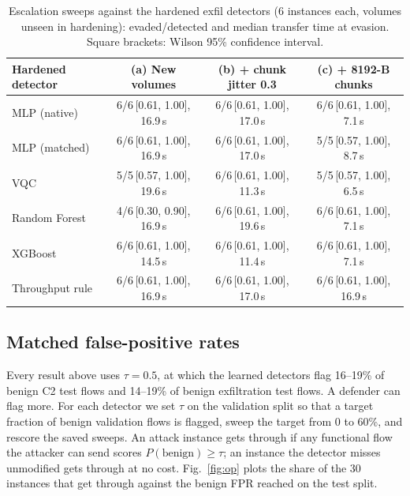 \documentclass[preprint,12pt]{elsarticle}
\begin{document}
\begin{table}[htbp]
\centering
\caption{Escalation sweeps against the hardened exfil detectors (6 instances each, volumes unseen in
hardening): evaded/detected and median transfer time at evasion. Square brackets: Wilson 95\% confidence interval.}
\label{tab:exfil-escalation}
\setlength{\tabcolsep}{3pt}\footnotesize
\begin{tabular}{lccc}
\toprule
Hardened detector & (a) New volumes & (b) + chunk jitter 0.3 & (c) + 8192-B chunks \\
\midrule
MLP (native)    & 6/6\,{\scriptsize[0.61, 1.00]}, 16.9\,s & 6/6\,{\scriptsize[0.61, 1.00]}, 17.0\,s & 6/6\,{\scriptsize[0.61, 1.00]}, 7.1\,s \\
MLP (matched)   & 6/6\,{\scriptsize[0.61, 1.00]}, 16.9\,s & 6/6\,{\scriptsize[0.61, 1.00]}, 17.0\,s & 5/5\,{\scriptsize[0.57, 1.00]}, 8.7\,s \\
VQC             & 5/5\,{\scriptsize[0.57, 1.00]}, 19.6\,s & 6/6\,{\scriptsize[0.61, 1.00]}, 11.3\,s & 5/5\,{\scriptsize[0.57, 1.00]}, 6.5\,s \\
Random Forest   & 4/6\,{\scriptsize[0.30, 0.90]}, 16.9\,s & 6/6\,{\scriptsize[0.61, 1.00]}, 19.6\,s & 6/6\,{\scriptsize[0.61, 1.00]}, 7.1\,s \\
XGBoost         & 6/6\,{\scriptsize[0.61, 1.00]}, 14.5\,s & 6/6\,{\scriptsize[0.61, 1.00]}, 11.4\,s & 6/6\,{\scriptsize[0.61, 1.00]}, 7.1\,s \\
Throughput rule & 6/6\,{\scriptsize[0.61, 1.00]}, 16.9\,s & 6/6\,{\scriptsize[0.61, 1.00]}, 17.0\,s & 6/6\,{\scriptsize[0.61, 1.00]}, 16.9\,s \\
\bottomrule
\end{tabular}
\end{table}

\subsection{Matched false-positive rates}
\label{sec:op}
Every result above uses $\tau=0.5$, at which the learned detectors flag 16--19\% of benign C2 test flows
and 14--19\% of benign exfiltration test flows. A defender can flag more. For each detector we set
$\tau$ on the validation split so that a target fraction of benign validation flows is flagged, sweep the
target from 0 to 60\%, and rescore the saved sweeps. An attack instance gets through if any functional
flow the attacker can send scores $P(\text{benign})\ge\tau$; an instance the detector misses unmodified
gets through at no cost. Fig.~\ref{fig:op} plots the share of the 30 instances that get through against
the benign FPR reached on the test split.
\end{document}

